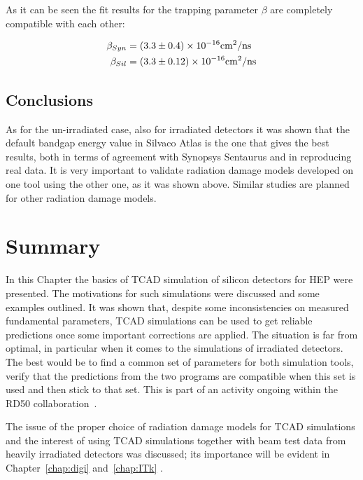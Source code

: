 As it can be seen the fit results for the trapping parameter $\beta$ are completely compatible with 
each other:

\begin{align}
\beta_{Syn}  &  = (3.3 \pm 0.4) \times 10^{-16} {\rm cm}^2/{\rm ns} \nonumber\\
\beta_{Sil}  & = (3.3 \pm 0.12) \times 10^{-16} {\rm cm}^2/{\rm ns} \nonumber\\
\end{align}

\subsection{Conclusions}
As for the un-irradiated case, also for irradiated detectors it was shown that the default bandgap energy 
value in Silvaco Atlas is the one that gives the best results, both in terms of agreement with Synopsys 
Sentaurus and in reproducing real data. It is very important to validate radiation damage models 
developed on one tool using the other one, as it was shown above. 
Similar studies are planned for other radiation damage 
models. 

\section{Summary}
\label{sec:TCADSummary}

In this Chapter the basics of TCAD simulation of silicon detectors for HEP were presented. 
The motivations for such simulations were discussed and some examples outlined. 
It was shown that, despite some inconsistencies on measured fundamental parameters, TCAD 
simulations can be used to get reliable predictions once some important corrections are applied. 
The situation is far from optimal, in particular when it comes to the simulations of irradiated 
detectors. The best would be to find a common set of parameters for both simulation tools, 
verify that the predictions from the two programs are compatible when this set is used and then 
stick to that set. This is part of an activity ongoing within the RD50 collaboration~\cite{RD50}.

The issue of the proper choice of radiation damage models for TCAD simulations 
and the interest of using TCAD simulations together with beam test data from heavily irradiated detectors 
was discussed; its importance will be evident  in Chapter~\ref{chap:digi} and~\ref{chap:ITk} . 


